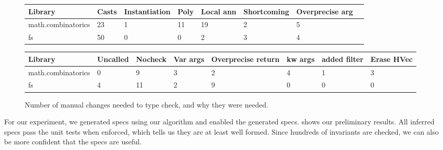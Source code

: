 \begin{figure*}
\begin{tabular}{| l | l | l | l | l | l | l | l |}
  Library            & Casts & Instantiation & Poly & Local ann & Shortcoming & Overprecise arg \\
  \hline
  math.combinatorics & 23    & 1             & 11   & 19        & 2           & 5             \\
  fs                 & 50    & 0             & 0    & 2         & 3           & 4             \\
\end{tabular}
\begin{tabular}{| l | l | l | l | l | l | l | l |}
  Library            & Uncalled & Nocheck & Var args & Overprecise return & kw args & added filter & Erase HVec\\
  \hline
  math.combinatorics & 0        & 9       & 3        & 2                  & 4       & 1            & 3\\
  fs                 & 4        & 11      & 2        & 9                  & 0       & 0            & 0\\
\end{tabular}
\caption{
  Number of manual changes needed to type check, and why they were needed.
  }
  \label{infer:fig:manualchanges}
\end{figure*}




For our experiment, we generated specs using our algorithm and enabled
the generated specs.  shows
our preliminary results. All inferred specs pass the unit
tests when enforced, which tells us they are at least well formed.
Since hundreds of invariants are checked, we can also be more confident
that the specs are useful.


